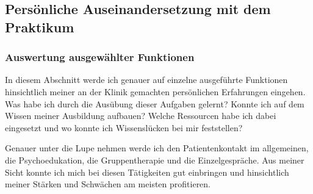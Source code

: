 \subsection{Persönliche Auseinandersetzung mit dem Praktikum} \label{sec:Auseinandersetzung}

\subsubsection{Auswertung ausgewählter Funktionen}
In diesem Abschnitt werde ich genauer auf einzelne ausgeführte Funktionen hinsichtlich meiner an der Klinik gemachten persönlichen Erfahrungen eingehen. Was habe ich durch die Ausübung dieser Aufgaben gelernt? Konnte ich auf dem Wissen meiner Ausbildung aufbauen? Welche Ressourcen habe ich dabei eingesetzt und wo konnte ich Wissenslücken bei mir feststellen? 

Genauer unter die Lupe nehmen werde ich den Patientenkontakt im allgemeinen, die Psychoedukation, die Gruppentherapie und die Einzelgespräche. Aus meiner Sicht konnte ich mich bei diesen Tätigkeiten gut einbringen und hinsichtlich meiner Stärken und Schwächen am meisten profitieren. 

